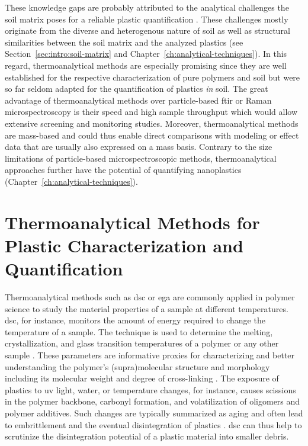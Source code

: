 These knowledge gaps are probably attributed to the analytical challenges the soil matrix poses for a reliable plastic quantification \citep{QiBehavior2020}. These challenges mostly originate from the diverse and heterogenous nature of soil as well as structural similarities between the soil matrix and the analyzed plastics (see Section~\ref{sec:intro:soil-matrix} and Chapter~\ref{ch:analytical-techniques}).
In this regard, thermoanalytical methods are especially promising since they are well established for the respective characterization of pure polymers and soil \citep{PicoPyrolysis2020} but were so far seldom adapted for the quantification of plastics \emph{in} soil. The great advantage of thermoanalytical methods over particle-based \ac{ftir} or Raman microspectroscopy is their speed and high sample throughput which would allow extensive screening and monitoring studies. Moreover, thermoanalytical methods are mass-based and could thus enable direct comparisons with modeling or effect data that are usually also expressed on a mass basis. Contrary to the size limitations of particle-based microspectroscopic methods, thermoanalytical approaches further have the potential of quantifying nanoplastics (Chapter~\ref{ch:analytical-techniques}).

\section{Thermoanalytical Methods for Plastic Characterization and Quantification}
\label{sec:intro:thermoanalysis}

Thermoanalytical methods such as \ac{dsc} or \ac{ega} are commonly applied in polymer science to study the material properties of a sample at different temperatures. \Ac{dsc}, for instance, monitors the amount of energy required to change the temperature of a sample. The technique is used to determine the melting, crystallization, and glass transition temperatures of a polymer or any other sample \citep{MenczelDifferential2009}. These parameters are informative proxies for characterizing and better understanding the polymer's (supra)molecular structure and morphology including its molecular weight and degree of cross-linking \citep{BialeSystematic2021}. The exposure of plastics to \ac{uv} light, water, or temperature changes, for instance, causes scissions in the polymer backbone, carbonyl formation, and volatilization of oligomers and polymer additives. Such changes are typically summarized as aging and often lead to embrittlement and the eventual disintegration of plastics \citep{VolynskiiStructural2007,WhitePolymer2006}. \Ac{dsc} can thus help to scrutinize the disintegration potential of a plastic material into smaller debris.


